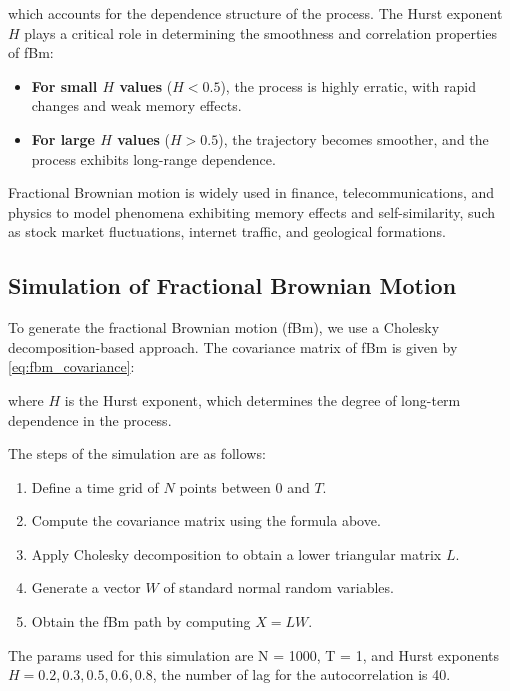 \documentclass[11pt]{extarticle}
\begin{document}
which accounts for the dependence structure of the process. The Hurst exponent \( H \) plays a critical role in determining the smoothness and correlation properties of fBm:

\begin{itemize}
    \item \textbf{For small \( H \) values} (\( H < 0.5 \)), the process is highly erratic, with rapid changes and weak memory effects.
    \item \textbf{For large \( H \) values} (\( H > 0.5 \)), the trajectory becomes smoother, and the process exhibits long-range dependence.
\end{itemize}

Fractional Brownian motion is widely used in finance, telecommunications, and physics to model phenomena exhibiting memory effects and self-similarity, such as stock market fluctuations, internet traffic, and geological formations.


\subsection{Simulation of Fractional Brownian Motion}

To generate the fractional Brownian motion (fBm), we use a Cholesky decomposition-based approach. The covariance matrix of fBm is given by \eqref{eq:fbm_covariance}:

where \( H \) is the Hurst exponent, which determines the degree of long-term dependence in the process.

The steps of the simulation are as follows:
\begin{enumerate}
    \item Define a time grid of \( N \) points between \( 0 \) and \( T \).
    \item Compute the covariance matrix using the formula above.
    \item Apply Cholesky decomposition to obtain a lower triangular matrix \( L \).
    \item Generate a vector \( W \) of standard normal random variables.
    \item Obtain the fBm path by computing \( X = L W \).
\end{enumerate}

The params used for this simulation are N = 1000, T = 1, and Hurst exponents \( H = 0.2, 0.3, 0.5, 0.6, 0.8 \), the number
of lag for the autocorrelation is 40.
\end{document}
